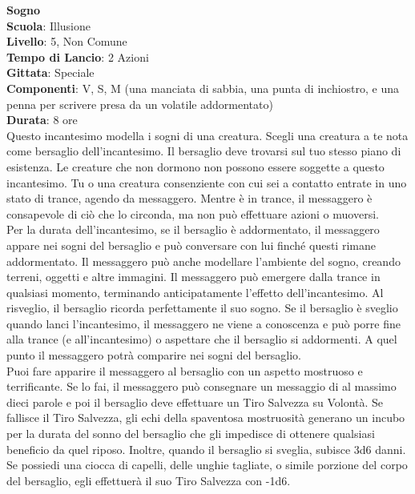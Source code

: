 \begin{multicols}{2}
\medskip\textbf{Sogno}\\
\textbf{Scuola}: Illusione\\
\textbf{Livello}: 5, Non Comune\\
\textbf{Tempo di Lancio}: 2 Azioni\\
\textbf{Gittata}: Speciale\\
\textbf{Componenti}: V, S, M (una manciata di sabbia, una punta di inchiostro, e una penna per scrivere presa da un volatile addormentato)\\
\textbf{Durata}: 8 ore\\
Questo incantesimo modella i sogni di una creatura. Scegli una creatura a te nota come bersaglio dell'incantesimo. Il bersaglio deve trovarsi sul tuo stesso piano di esistenza. Le creature che non dormono non possono essere soggette a questo incantesimo. Tu o una creatura consenziente con cui sei a contatto entrate in uno stato di trance, agendo da messaggero. Mentre è in trance, il messaggero è consapevole di ciò che lo circonda, ma non può effettuare azioni o muoversi.\\
Per la durata dell'incantesimo, se il bersaglio è addormentato, il messaggero appare nei sogni del bersaglio e può conversare con lui finché questi rimane addormentato. Il messaggero può anche modellare l'ambiente del sogno, creando terreni, oggetti e altre immagini. Il messaggero può emergere dalla trance in qualsiasi momento, terminando anticipatamente l'effetto dell'incantesimo. Al risveglio, il bersaglio ricorda perfettamente il suo sogno. Se il bersaglio è sveglio quando lanci l'incantesimo, il messaggero ne viene a conoscenza e può porre fine alla trance (e all'incantesimo) o aspettare che il bersaglio si addormenti. A quel punto il messaggero potrà comparire nei sogni del bersaglio.\\
Puoi fare apparire il messaggero al bersaglio con un aspetto mostruoso e terrificante. Se lo fai, il messaggero può consegnare un messaggio di al massimo dieci parole e poi il bersaglio deve effettuare un Tiro Salvezza su Volontà. Se fallisce il Tiro Salvezza, gli echi della spaventosa mostruosità generano un incubo per la durata del sonno del bersaglio che gli impedisce di ottenere qualsiasi beneficio da quel riposo. Inoltre, quando il bersaglio si sveglia, subisce 3d6 danni.\\
Se possiedi una ciocca di capelli, delle unghie tagliate, o simile porzione del corpo del bersaglio, egli effettuerà il suo Tiro Salvezza con -1d6.


\end{multicols}
